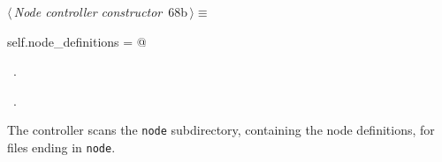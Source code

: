 \documentclass[
    a4paper,      %
    10pt,         %
    openright,    %
    notitlepage,  %
    parskip=half, %
]{scrreprt}       %
\theoremstyle{definition}                    %
\begin{document}
\begin{flushleft} \small
\begin{minipage}{\linewidth}\label{scrap113}\raggedright\small
{} $\langle\,${\itshape Node controller constructor}\nobreak\ {\footnotesize {68b}}$\,\rangle\equiv$
\vspace{-1exm}
\begin{list}{}{} \item
\mbox{}\lstinline@    self.node_definitions = {}@{\NWsep}
\end{list}
\vspace{-1.5ex}
\footnotesize
\begin{list}{}{\setlength{\itemsep}{-\parsep}\setlength{\itemindent}{-\leftmargin}}
\item \NWtxtMacroDefBy\ .
\item \NWtxtMacroRefIn\ .

\item{}
\end{list}
\end{minipage}\vspace{4ex}
\end{flushleft}
The controller scans the \verb+node+ subdirectory, containing the node
definitions, for files ending in \verb+node+.
\end{document}
